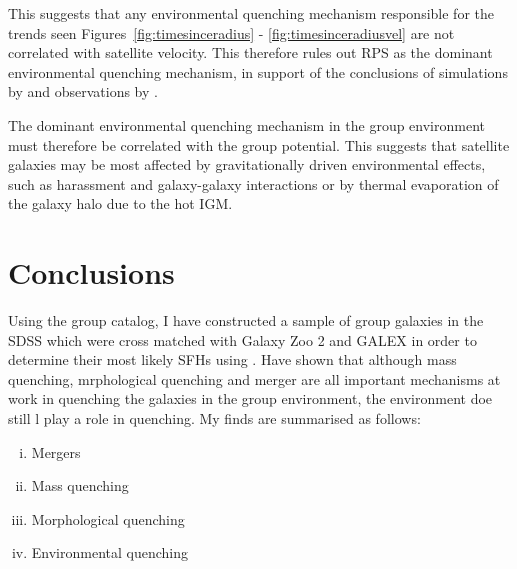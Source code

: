 This suggests that any environmental quenching mechanism responsible for the trends seen Figures~\ref{fig:timesinceradius} - \ref{fig:timesinceradiusvel} are not correlated with satellite velocity. This therefore rules out RPS as the dominant environmental quenching mechanism, in support of the conclusions of simulations by \citet{emerick16, fillingham16} and observations by \citet{mcgee14}. 

The dominant environmental quenching mechanism in the group environment must therefore be correlated with the group potential. This suggests that satellite galaxies may be most affected by gravitationally driven environmental effects, such as harassment and galaxy-galaxy interactions or by thermal evaporation of the galaxy halo due to the hot IGM. 


\section{Conclusions}\label{sec:conc}

Using the \citet{berlind06} group catalog, I have constructed a sample of group galaxies in the SDSS which were cross matched with Galaxy Zoo 2 and GALEX in order to determine their most likely SFHs using \starpy. Have shown that although mass quenching, mrphological quenching and merger are all important mechanisms at work in quenching the galaxies in the group environment, the environment doe still l play a role in quenching. My finds are summarised as follows:
\begin{enumerate}[(i)]
\item Mergers
 
\item Mass quenching
 
 \item Morphological quenching
 
 \item Environmental quenching
 
\end{enumerate}

